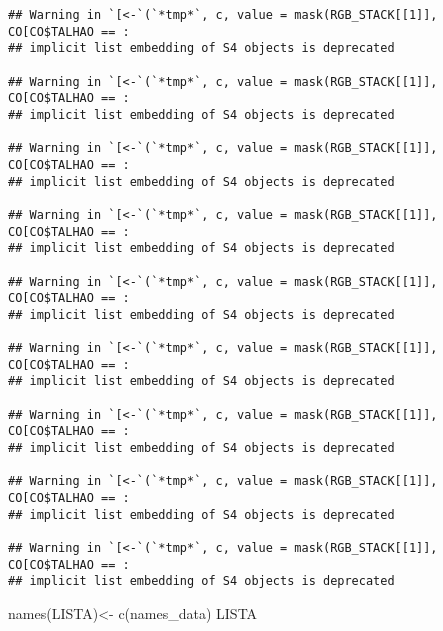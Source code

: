 \documentclass[
]{article}
\newenvironment{Shaded}{\begin{snugshade}}{\end{snugshade}}
\newcommand{\ControlFlowTok}[1]{\textcolor[rgb]{0.13,0.29,0.53}{\textbf{#1}}}
\newcommand{\DecValTok}[1]{\textcolor[rgb]{0.00,0.00,0.81}{#1}}
\newcommand{\FunctionTok}[1]{\textcolor[rgb]{0.00,0.00,0.00}{#1}}
\newcommand{\NormalTok}[1]{#1}
\newcommand{\OtherTok}[1]{\textcolor[rgb]{0.56,0.35,0.01}{#1}}
\newcommand{\SpecialCharTok}[1]{\textcolor[rgb]{0.00,0.00,0.00}{#1}}
\begin{document}
\begin{Shaded}
\end{Shaded}

\begin{verbatim}
## Warning in `[<-`(`*tmp*`, c, value = mask(RGB_STACK[[1]], CO[CO$TALHAO == :
## implicit list embedding of S4 objects is deprecated

## Warning in `[<-`(`*tmp*`, c, value = mask(RGB_STACK[[1]], CO[CO$TALHAO == :
## implicit list embedding of S4 objects is deprecated

## Warning in `[<-`(`*tmp*`, c, value = mask(RGB_STACK[[1]], CO[CO$TALHAO == :
## implicit list embedding of S4 objects is deprecated

## Warning in `[<-`(`*tmp*`, c, value = mask(RGB_STACK[[1]], CO[CO$TALHAO == :
## implicit list embedding of S4 objects is deprecated

## Warning in `[<-`(`*tmp*`, c, value = mask(RGB_STACK[[1]], CO[CO$TALHAO == :
## implicit list embedding of S4 objects is deprecated

## Warning in `[<-`(`*tmp*`, c, value = mask(RGB_STACK[[1]], CO[CO$TALHAO == :
## implicit list embedding of S4 objects is deprecated

## Warning in `[<-`(`*tmp*`, c, value = mask(RGB_STACK[[1]], CO[CO$TALHAO == :
## implicit list embedding of S4 objects is deprecated

## Warning in `[<-`(`*tmp*`, c, value = mask(RGB_STACK[[1]], CO[CO$TALHAO == :
## implicit list embedding of S4 objects is deprecated

## Warning in `[<-`(`*tmp*`, c, value = mask(RGB_STACK[[1]], CO[CO$TALHAO == :
## implicit list embedding of S4 objects is deprecated
\end{verbatim}

\begin{Shaded}
\begin{Highlighting}[]
 \FunctionTok{names}\NormalTok{(LISTA)}\OtherTok{\textless{}{-}} \FunctionTok{c}\NormalTok{(names\_data)}
\NormalTok{ LISTA}
\end{Highlighting}
\end{Shaded}
\end{document}
